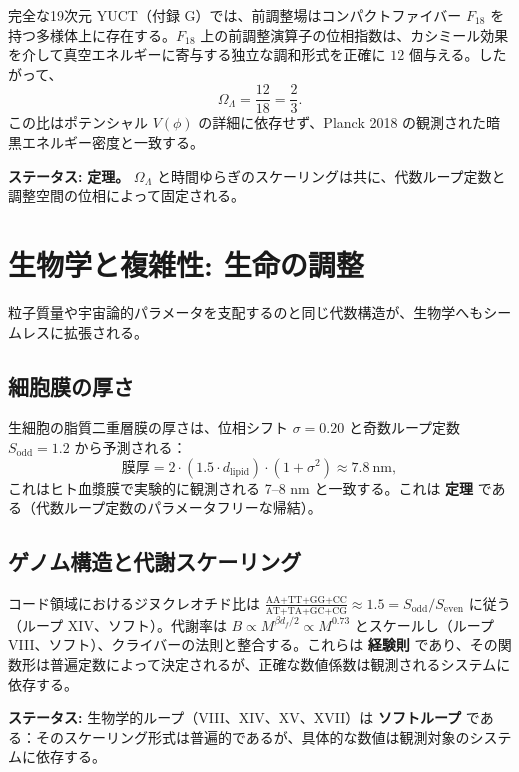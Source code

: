 \documentclass[12pt,a4paper]{article}
\begin{document}
	完全な19次元 YUCT（付録 G）では、前調整場はコンパクトファイバー \(F_{18}\) を持つ多様体上に存在する。\(F_{18}\) 上の前調整演算子の位相指数は、カシミール効果を介して真空エネルギーに寄与する独立な調和形式を正確に \(12\) 個与える。したがって、
	\begin{equation}
		\boxed{\Omega_\Lambda = \frac{12}{18} = \frac{2}{3}}.
		\label{eq:OmegaLambda}
	\end{equation}
	この比はポテンシャル \(V(\phi)\) の詳細に依存せず、Planck 2018 の観測された暗黒エネルギー密度と一致する。
	
	\textbf{ステータス:} \textbf{定理。} \(\Omega_\Lambda\) と時間ゆらぎのスケーリングは共に、代数ループ定数と調整空間の位相によって固定される。
	
	\section{生物学と複雑性: 生命の調整}
	\label{sec:biology}
	
	粒子質量や宇宙論的パラメータを支配するのと同じ代数構造が、生物学へもシームレスに拡張される。
	
	\subsection{細胞膜の厚さ}
	
	生細胞の脂質二重層膜の厚さは、位相シフト \(\sigma = 0.20\) と奇数ループ定数 \(S_{\mathrm{odd}} = 1.2\) から予測される：
	\[
	\text{膜厚} = 2 \cdot (1.5 \cdot d_{\mathrm{lipid}}) \cdot (1 + \sigma^2) \approx 7.8\ \mathrm{nm},
	\]
	これはヒト血漿膜で実験的に観測される 7--8 nm と一致する。これは \textbf{定理} である（代数ループ定数のパラメータフリーな帰結）。
	
	\subsection{ゲノム構造と代謝スケーリング}
	
	コード領域におけるジヌクレオチド比は \(\frac{\text{AA+TT+GG+CC}}{\text{AT+TA+GC+CG}} \approx 1.5 = S_{\mathrm{odd}}/S_{\mathrm{even}}\) に従う（ループ XIV、ソフト）。代謝率は \(B \propto M^{\beta d_f/2} \propto M^{0.73}\) とスケールし（ループ VIII、ソフト）、クライバーの法則と整合する。これらは \textbf{経験則} であり、その関数形は普遍定数によって決定されるが、正確な数値係数は観測されるシステムに依存する。
	
	\textbf{ステータス:} 生物学的ループ（VIII、XIV、XV、XVII）は \textbf{ソフトループ} である：そのスケーリング形式は普遍的であるが、具体的な数値は観測対象のシステムに依存する。
	
\end{document}
